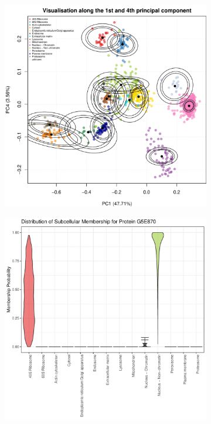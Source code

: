\documentclass[12pt,english]{article}\usepackage[]{graphicx}\usepackage[]{color}
\makeatletter
\def\maxwidth{ %
  \ifdim\Gin@nat@width>\linewidth
    \linewidth
  \else
    \Gin@nat@width
  \fi
}
\newenvironment{knitrout}{}{} %
\makeatother
\begin{document}
\begin{figure}[ht]
  \begin{subfigure}[t]{0.45\textwidth}
        \centering
\begin{knitrout}
\color{fgcolor}
\includegraphics[width=\maxwidth]{figure/unnamed-chunk-5-1} 

\end{knitrout}
        \caption{}
\end{subfigure}%
\hfill
\begin{subfigure}[t]{0.45\textwidth}
\begin{knitrout}
\color{fgcolor}
\includegraphics[width=\maxwidth]{figure/unnamed-chunk-6-1} 


\end{knitrout}
\end{subfigure}
\end{figure}
\end{document}
